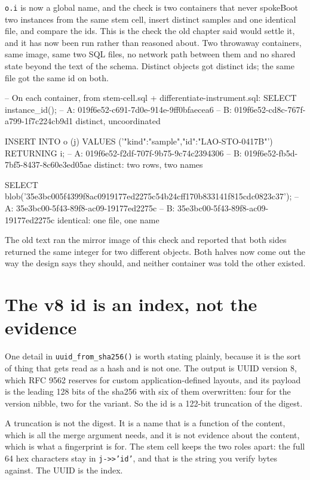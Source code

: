 \begin{Correspondence}{\texttt{o.i} is now a global name, and the check is two containers that never spoke}{Boot two instances from the same stem cell, insert distinct samples and one identical file, and compare the ids.}
This is the check the old chapter said would settle it, and it has now been run rather than reasoned about. Two throwaway containers, same image, same two SQL files, no network path between them and no shared state beyond the text of the schema. Distinct objects got distinct ids; the same file got the same id on both.
\begin{Check}
-- On each container, from stem-cell.sql + differentiate-instrument.sql:
SELECT instance_id();
--   A: 019f6e52-c691-7d0e-914e-9ff0bfaecea6
--   B: 019f6e52-cd8c-767f-a799-1f7c224cb9d1     distinct, uncoordinated

INSERT INTO o (j) VALUES ('{"kind":"sample","id":"LAO-STO-0417B"}') RETURNING i;
--   A: 019f6e52-f2df-707f-9b75-9c74c2394306
--   B: 019f6e52-fb5d-7bf5-8437-8c60e3ed05ae     distinct: two rows, two names

SELECT blob('35e3bc005f4399f8ac0919177ed2275c54b24cff170b833141f815cdc0823c37');
--   A: 35e3bc00-5f43-89f8-ac09-19177ed2275c
--   B: 35e3bc00-5f43-89f8-ac09-19177ed2275c     identical: one file, one name
\end{Check}
The old text ran the mirror image of this check and reported that both sides returned the same integer for two different objects. Both halves now come out the way the design says they should, and neither container was told the other existed.
\end{Correspondence}

\section{The v8 id is an index, not the evidence}

One detail in \texttt{uuid\_from\_sha256()} is worth stating plainly, because it is the sort of thing that gets read as a hash and is not one. The output is UUID version 8, which RFC 9562 reserves for custom application-defined layouts, and its payload is the leading 128 bits of the sha256 with six of them overwritten: four for the version nibble, two for the variant. So the id is a 122-bit truncation of the digest.

A truncation is not the digest. It is a name that is a function of the content, which is all the merge argument needs, and it is not evidence about the content, which is what a fingerprint is for. The stem cell keeps the two roles apart: the full 64 hex characters stay in \texttt{j->>'id'}, and that is the string you verify bytes against. The UUID is the index.


